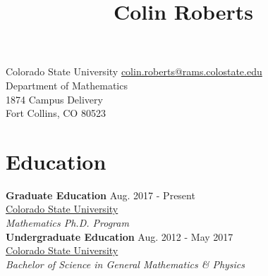 \documentclass[12pt]{article} %
\begin{document}

\title{Colin Roberts} %


\begin{flushleft}
Colorado State University \hfill \href{mailto:colin.roberts@rams.colostate.edu}{colin.roberts@rams.colostate.edu}\\
Department of Mathematics \hfill \\
1874 Campus Delivery\\
Fort Collins, CO 80523
\end{flushleft}
\noindent\makebox[\textwidth]{\rule{\textwidth}{0.5mm}}




\section{Education}

\begin{flushleft}
\textbf{Graduate Education} \hfill Aug. 2017 - Present\\
\href{http://www.colosate.edu}{Colorado State University} \hfill \\
\emph{Mathematics Ph.D. Program}\\
\vspace*{10pt}
\textbf{Undergraduate Education} \hfill Aug. 2012 - May 2017\\
\href{http://www.colostate.edu}{Colorado State University}\\
\emph{Bachelor of Science in General Mathematics \& Physics}
\end{flushleft}
\noindent\makebox[\textwidth]{\rule{\textwidth}{0.5mm}}





\end{document}
